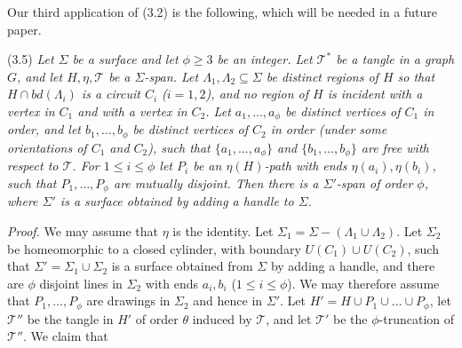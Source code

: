 Our third application of (3.2) is the following, which will be needed in a future paper.

\stmt
(3.5) \textit{Let $\Sigma$ be a surface and let $\phi \ge 3$ be an integer. Let $\mathscr{T}^*$ be a tangle in a graph $G$, and let $H, \eta, \mathscr{T}$ be a $\Sigma$-span. Let $\Lambda_1, \Lambda_2 \subseteq \Sigma$ be distinct regions of $H$ so that $H \cap bd(\Lambda_i)$ is a circuit $C_i$ ($i = 1, 2$), and no region of $H$ is incident with a vertex in $C_1$ and with a vertex in $C_2$. Let $a_1, \dots, a_\phi$ be distinct vertices of $C_1$ in order, and let $b_1, \dots, b_\phi$ be distinct vertices of $C_2$ in order (under some orientations of $C_1$ and $C_2$), such that $\{a_1, \dots, a_\phi\}$ and $\{b_1, \dots, b_\phi\}$ are free with respect to $\mathscr{T}$. For $1 \le i \le \phi$ let $P_i$ be an $\eta(H)$-path with ends $\eta(a_i), \eta(b_i)$, such that $P_1, \dots, P_\phi$ are mutually disjoint. Then there is a $\Sigma'$-span of order $\phi$, where $\Sigma'$ is a surface obtained by adding a handle to $\Sigma$.}

\textit{Proof.} We may assume that $\eta$ is the identity. Let $\Sigma_1 = \Sigma - (\Lambda_1 \cup \Lambda_2)$. Let $\Sigma_2$ be homeomorphic to a closed cylinder, with boundary $U(C_1) \cup U(C_2)$, such that $\Sigma' = \Sigma_1 \cup \Sigma_2$ is a surface obtained from $\Sigma$ by adding a handle, and there are $\phi$ disjoint lines in $\Sigma_2$ with ends $a_i, b_i$ ($1 \le i \le \phi$). We may therefore assume that $P_1, \dots, P_\phi$ are drawings in $\Sigma_2$ and hence in $\Sigma'$. Let $H' = H \cup P_1 \cup \dots \cup P_\phi$, let $\mathscr{T}''$ be the tangle in $H'$ of order $\theta$ induced by $\mathscr{T}$, and let $\mathscr{T}'$ be the $\phi$-truncation of $\mathscr{T}''$. We claim that
